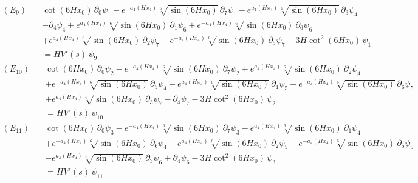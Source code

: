 \begin{align*}
(E_{9})\quad & \cot \left(6 H x_0\right)\,\partial_{0}\psi_{1} - e^{-a_4\left(H x_4\right)} \sqrt[6]{\sin \left(6 H x_0\right)}\,\partial_{7}\psi_{1} - e^{a_4\left(H x_4\right)} \sqrt[6]{\sin \left(6 H x_0\right)}\,\partial_{3}\psi_{4} \\
 &  - \partial_{4}\psi_{4} + e^{a_4\left(H x_4\right)} \sqrt[6]{\sin \left(6 H x_0\right)}\,\partial_{1}\psi_{6} + e^{-a_4\left(H x_4\right)} \sqrt[6]{\sin \left(6 H x_0\right)}\,\partial_{6}\psi_{6} \\
 &  + e^{a_4\left(H x_4\right)} \sqrt[6]{\sin \left(6 H x_0\right)}\,\partial_{2}\psi_{7} - e^{-a_4\left(H x_4\right)} \sqrt[6]{\sin \left(6 H x_0\right)}\,\partial_{5}\psi_{7} - 3 H \cot ^2\left(6 H x_0\right)\,\psi_{1} \\
 & = H V'(s)\,\psi_{9}
\end{align*}
\begin{align*}
(E_{10})\quad & \cot \left(6 H x_0\right)\,\partial_{0}\psi_{2} - e^{-a_4\left(H x_4\right)} \sqrt[6]{\sin \left(6 H x_0\right)}\,\partial_{7}\psi_{2} + e^{a_4\left(H x_4\right)} \sqrt[6]{\sin \left(6 H x_0\right)}\,\partial_{2}\psi_{4} \\
 &  + e^{-a_4\left(H x_4\right)} \sqrt[6]{\sin \left(6 H x_0\right)}\,\partial_{5}\psi_{4} - e^{a_4\left(H x_4\right)} \sqrt[6]{\sin \left(6 H x_0\right)}\,\partial_{1}\psi_{5} - e^{-a_4\left(H x_4\right)} \sqrt[6]{\sin \left(6 H x_0\right)}\,\partial_{6}\psi_{5} \\
 &  + e^{a_4\left(H x_4\right)} \sqrt[6]{\sin \left(6 H x_0\right)}\,\partial_{3}\psi_{7} - \partial_{4}\psi_{7} - 3 H \cot ^2\left(6 H x_0\right)\,\psi_{2} \\
 & = H V'(s)\,\psi_{10}
\end{align*}
\begin{align*}
(E_{11})\quad & \cot \left(6 H x_0\right)\,\partial_{0}\psi_{3} - e^{-a_4\left(H x_4\right)} \sqrt[6]{\sin \left(6 H x_0\right)}\,\partial_{7}\psi_{3} - e^{a_4\left(H x_4\right)} \sqrt[6]{\sin \left(6 H x_0\right)}\,\partial_{1}\psi_{4} \\
 &  + e^{-a_4\left(H x_4\right)} \sqrt[6]{\sin \left(6 H x_0\right)}\,\partial_{6}\psi_{4} - e^{a_4\left(H x_4\right)} \sqrt[6]{\sin \left(6 H x_0\right)}\,\partial_{2}\psi_{5} + e^{-a_4\left(H x_4\right)} \sqrt[6]{\sin \left(6 H x_0\right)}\,\partial_{5}\psi_{5} \\
 &  - e^{a_4\left(H x_4\right)} \sqrt[6]{\sin \left(6 H x_0\right)}\,\partial_{3}\psi_{6} + \partial_{4}\psi_{6} - 3 H \cot ^2\left(6 H x_0\right)\,\psi_{3} \\
 & = H V'(s)\,\psi_{11}
\end{align*}
